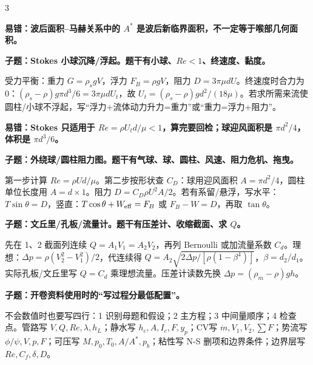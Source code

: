 \documentclass[a4paper]{article}
\newcommand{\qt}[1]{\vspace{0.25pt}\colorbox{Q}{\parbox{\dimexpr\linewidth-2\fboxsep}{\color{white}\bfseries #1}}\par}
\newcommand{\ans}[1]{\colorbox{G}{\parbox{\dimexpr\linewidth-2\fboxsep}{#1}}\par}
\newcommand{\warn}[1]{\colorbox{Y}{\parbox{\dimexpr\linewidth-2\fboxsep}{\color{E}\bfseries #1}}\par}
\begin{document}
\begin{multicols}{3}
\warn{易错：波后面积--马赫关系中的 $A^*$ 是波后新临界面积，不一定等于喉部几何面积。}
\qt{子题：Stokes 小球沉降/浮起。题干有小球、$Re<1$、终速度、黏度。}
\ans{受力平衡：重力 $G=\rho_s gV$，浮力 $F_B=\rho gV$，阻力 $D=3\pi\mu dU$。终速度时合力为0：$(\rho_s-\rho)g\pi d^3/6=3\pi\mu dU_t$，故 $U_t=(\rho_s-\rho)gd^2/(18\mu)$。若求所需来流使圆柱/小球不浮起，写“浮力+流体动力升力=重力”或“重力=浮力+阻力”。}
\warn{易错：Stokes 只适用于 $Re=\rho U_td/\mu<1$，算完要回检；球迎风面积是 $\pi d^2/4$，体积是 $\pi d^3/6$。}
\qt{子题：外绕球/圆柱阻力图。题干有气球、球、圆柱、风速、阻力危机、拖曳。}
\ans{第一步计算 $Re=\rho Ud/\mu$。第二步按形状查 $C_D$：球用迎风面积 $A=\pi d^2/4$，圆柱单位长度用 $A=d\times1$。阻力 $D=C_D\rho U^2A/2$。若有系留/悬浮，写水平：$T\sin\theta=D$，竖直：$T\cos\theta+W_{\rm eff}=F_B$ 或 $F_B-W=D$，再取 $\tan\theta$。}
\qt{子题：文丘里/孔板/流量计。题干有压差计、收缩截面、求 $Q$。}
\ans{先在 1、2 截面列连续 $Q=A_1V_1=A_2V_2$，再列 Bernoulli 或加流量系数 $C_d$。理想：$\Delta p=\rho(V_2^2-V_1^2)/2$，代连续得 $Q=A_2\sqrt{2\Delta p/[\rho(1-\beta^4)]}$，$\beta=d_2/d_1$。实际孔板/文丘里写 $Q=C_d$ 乘理想流量。压差计读数先换 $\Delta p=(\rho_m-\rho)gh$。}
\qt{子题：开卷资料使用时的“写过程分最低配置”。}
\ans{不会数值时也要写四行：1 识别母题和假设；2 主方程；3 中间量顺序；4 检查点。管路写 $V,Q,Re,\lambda,h_L$；静水写 $h_c,A,I_c,F,y_p$；CV写 $\dot m,V_1,V_2,\sum F$；势流写 $\phi/\psi,V,p,F$；可压写 $M,p_0,T_0,A/A^*,p_b$；粘性写 N-S 删项和边界条件；边界层写 $Re,C_f,\delta,D$。}


\end{multicols}
\end{document}
